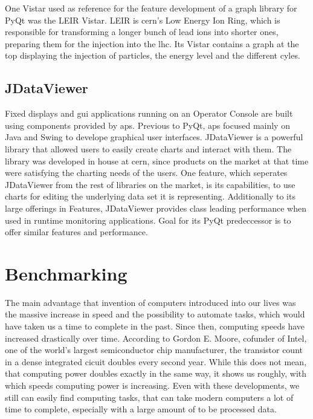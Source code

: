 One Vistar used as reference for the feature development of a graph library for PyQt was the LEIR Vistar. LEIR is \gls{cern}'s Low Energy Ion Ring, which is responsible for transforming a longer bunch of lead ions into shorter ones, preparing them for the injection into the \gls{lhc}. Its Vistar contains a graph at the top displaying the injection of particles, the energy level and the different cyles.
\cite{Leir}





\subsection{JDataViewer}
\label{sec:fundamentals:cerncharting:jdataviewer}

Fixed displays and \gls{gui} applications running on an Operator Console are built using components provided by \gls{aps}. Previous to PyQt, \gls{aps} focused mainly on Java and Swing to develope graphical user interfaces. JDataViewer is a powerful library that allowed users to easily create charts and interact with them. The library was developed in house at \gls{cern}, since products on the market at that time were satisfying the charting needs of the users. One feature, which seperates JDataViewer from the rest of libraries on the market, is its capabilities, to use charts for editing the underlying data set it is representing. Additionally to its large offerings in Features, JDataViewer provides class leading performance when used in runtime monitoring applications. Goal for its PyQt predeccessor is to offer similar features and performance.
\cite{JDataViewer}





\section{Benchmarking}
\label{sec:fundamentals:benchmarking}

The main advantage that invention of computers introduced into our lives was the massive increase in speed and the possibility to automate tasks, which would have taken us a time to complete in the past. Since then, computing speeds have increased drastically over time. According to Gordon E. Moore, cofunder of Intel, one of the world's largest semiconductor chip manufacturer, the transistor count in a dense integrated cicuit doubles every second year. While this does not mean, that computing power doubles exactly in the same way, it shows us roughly, with which speeds computing power is increasing. Even with these developments, we still can easily find computing tasks, that can take modern computers a lot of time to complete, especially with a large amount of to be processed data.

